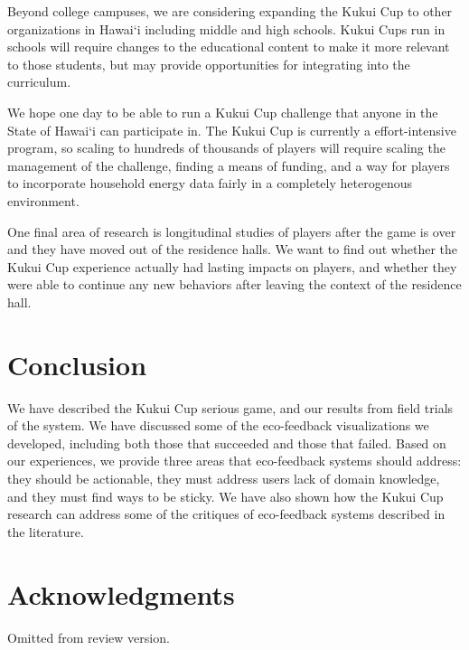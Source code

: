 \documentclass{sigchi}
\newcommand{\Hawaii}{Hawai`i\xspace}
\begin{document}
Beyond college campuses, we are considering expanding the Kukui Cup to other organizations in \Hawaii including middle and high schools. Kukui Cups run in schools will require changes to the educational content to make it more relevant to those students, but may provide opportunities for integrating into the curriculum.

We hope one day to be able to run a Kukui Cup challenge that anyone in the State of \Hawaii can participate in. The Kukui Cup is currently a effort-intensive program, so scaling to hundreds of thousands of players will require scaling the management of the challenge, finding a means of funding, and a way for players to incorporate household energy data fairly in a completely heterogenous environment.

One final area of research is longitudinal studies of players after the game is over and they have moved out of the residence halls. We want to find out whether the Kukui Cup experience actually had lasting impacts on players, and whether they were able to continue any new behaviors after leaving the context of the residence hall.


\section{Conclusion}

We have described the Kukui Cup serious game, and our results from field trials of the system. We have discussed some of the eco-feedback visualizations we developed, including both those that succeeded and those that failed. Based on our experiences, we provide three areas that eco-feedback systems should address: they should be actionable, they must address users lack of domain knowledge, and they must find ways to be sticky. We have also shown how the Kukui Cup research can address some of the critiques of eco-feedback systems described in the literature.


\section{Acknowledgments}

Omitted from review version.


%
%
%
%
%
\balance



\end{document}
